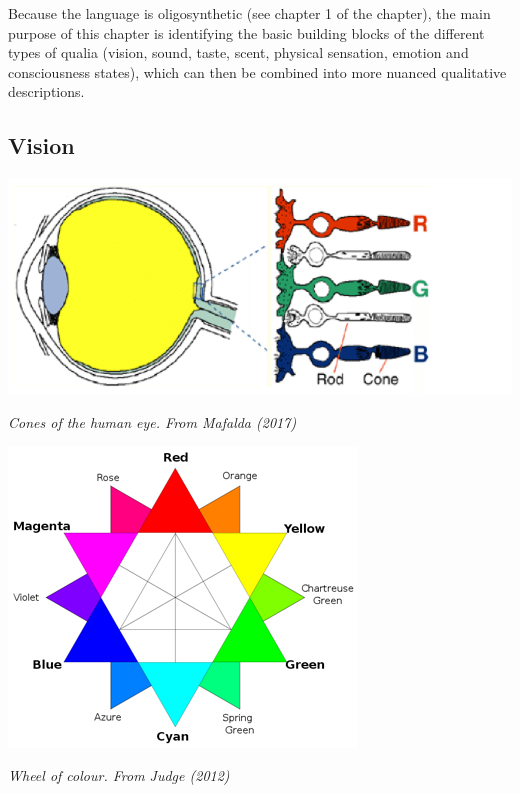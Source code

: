 Because the language is oligosynthetic (see chapter 1 of the chapter), the main purpose of this chapter is identifying the basic building blocks of the different types of qualia (vision, sound, taste, scent, physical sensation, emotion and consciousness states), which can then be combined into more nuanced qualitative descriptions.

\vspace*{-2cm}
\subsection{Vision}


\begin{center}
\includegraphics[scale=0.4]{./Images/eyes.jpeg}


{\it \footnotesize Cones of the human eye. From Mafalda (2017)}

\end{center}
\begin{center}

\includegraphics[scale=0.4]{./Images/colorwheel.jpg}

{\it \footnotesize Wheel of colour. From Judge (2012)}
\end{center}


